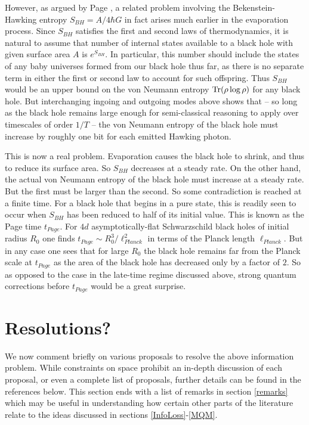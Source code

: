 \documentclass[12pt]{article}
\begin{document}
However, as argued by Page \cite{Page:1993df}, a related problem involving the Bekenstein-Hawking entropy
$S_{BH} = A/4\hbar G$ in fact arises much earlier in the evaporation process.  Since $S_{BH}$ satisfies the first and second laws of thermodynamics, it is natural to assume that number of internal states available to a black hole with given surface area $A$ is $e^{S_{BH}}$.  In particular, this number should include the states of any baby universes formed from our black hole thus far, as there is no separate term in either the first or second law to account for such offspring.  Thus $S_{BH}$ would be an upper bound on the von Neumann entropy ${\rm{Tr}} (\rho\, {\rm log}\, \rho)$ for any black hole.  But interchanging ingoing and outgoing modes above shows that -- so long as the black hole remains large enough for semi-classical reasoning to apply over timescales of order $1/T$ -- the von Neumann entropy of the black hole must increase by roughly one bit for each emitted Hawking photon.

This is now a real problem.  Evaporation causes the black hole to shrink, and thus to reduce its surface area.  So $S_{BH}$ decreases at a steady rate.  On the other hand, the actual von Neumann entropy of the black hole must increase at a steady rate.  But the first must be larger than the second.   So some contradiction is reached at a finite time.  For a black hole that begins in a pure state, this is readily seen to occur when $S_{BH}$ has been reduced to half of its initial value.  This is known as the Page time $t_{Page}$.  For $4d$ asymptotically-flat Schwarzschild black holes of initial radius $R_0$ one finds $t_{Page} \sim R_0^3/\ell_{Planck}^2$ in terms of the Planck length $\ell_{Planck}.$   But in any case one sees that for large $R_0$ the black hole remains far from the Planck scale at $t_{Page}$ as the area of the black hole has decreased only by a factor of $2$.  So as opposed to the case in the late-time regime discussed above, strong quantum corrections before $t_{Page}$ would be a great surprise.

\section{Resolutions?}
\label{proposals}

We now comment briefly on various proposals to resolve the above information problem.  While constraints on space prohibit an in-depth discussion of each proposal, or even a complete list of proposals, further details can be found in the references below.  This section ends with a list of remarks in section \ref{remarks} which may be useful in understanding how certain other parts of the literature relate to the ideas discussed in sections \ref{InfoLoss}-\ref{MQM}.
\end{document}
